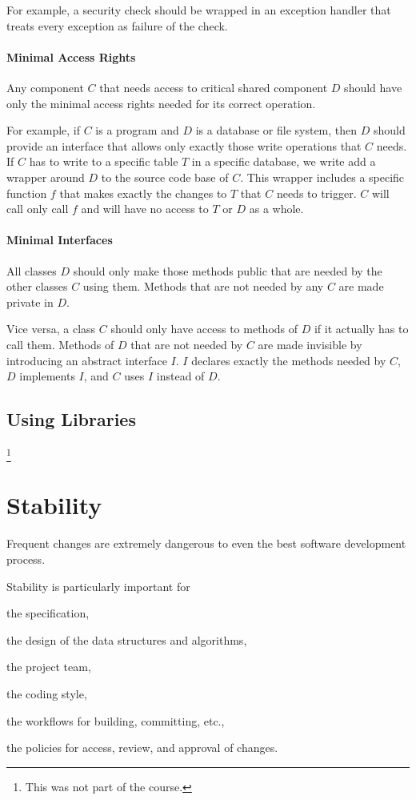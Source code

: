 For example, a security check should be wrapped in an exception handler that treats every exception as failure of the check.

\paragraph{Minimal Access Rights}
Any component $C$ that needs access to critical shared component $D$ should have only the minimal access rights needed for its correct operation.

For example, if $C$ is a program and $D$ is a database or file system, then $D$ should provide an interface that allows only exactly those write operations that $C$ needs.
If $C$ has to write to a specific table $T$ in a specific database, we write add a wrapper around $D$ to the source code base of $C$.
This wrapper includes a specific function $f$ that makes exactly the changes to $T$ that $C$ needs to trigger.
$C$ will call only call $f$ and will have no access to $T$ or $D$ as a whole.

\paragraph{Minimal Interfaces}
All classes $D$ should only make those methods public that are needed by the other classes $C$ using them.
Methods that are not needed by any $C$ are made private in $D$.

Vice versa, a class $C$ should only have access to methods of $D$ if it actually has to call them.
Methods of $D$ that are not needed by $C$ are made invisible by introducing an abstract interface $I$.
$I$ declares exactly the methods needed by $C$, $D$ implements $I$, and $C$ uses $I$ instead of $D$.

\subsection{Using Libraries}

\footnote{This was not part of the course.}

\section{Stability}

Frequent changes are extremely dangerous to even the best software development process.

Stability is particularly important for
\begin{compactitem}
  \item the specification,
  \item the design of the data structures and algorithms,
  \item the project team,
  \item the coding style,
  \item the workflows for building, committing, etc.,
  \item the policies for access, review, and approval of changes.
\end{compactitem}

